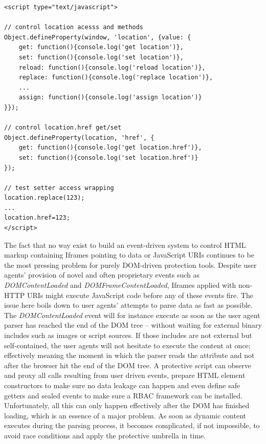 \begin{lstlisting}[captionpos=b,label=lst:location-control-ff,caption=Example code for location control in Firefox]
<script type="text/javascript">

// control location acesss and methods
Object.defineProperty(window, 'location', {value: {
    get: function(){console.log('get location')},
    set: function(){console.log('set location')},
    reload: function(){console.log('reload location')},
    replace: function(){console.log('replace location')},
    ...
    assign: function(){console.log('assign location')}
}});

// control location.href get/set
Object.defineProperty(location, 'href', {
    get: function(){console.log('get location.href')},
    set: function(){console.log('set location.href')}
});

// test setter access wrapping
location.replace(123);
...
location.href=123;
</script>
\end{lstlisting}

    The fact that no way exist to build an event-driven system to control HTML markup containing Iframes pointing to data or JavaScript URIs continues to be the most pressing problem for purely DOM-driven protection tools. Despite user agents' provision of novel and often proprietary events such as \textit{DOMContentLoaded} and \textit{DOMFrameContentLoaded}, Iframes applied with non-HTTP URIs might execute JavaScript code before any of these events fire. The issue here boils down to user agents' attempts to parse data as fast as possible. The \textit{DOMContentLoaded} event will for instance execute as soon as the user agent parser has reached the end of the DOM tree -- without waiting for external binary includes such as images or script sources. If those includes are not external but self-contained, the user agents will not hesitate to execute the content at once; effectively meaning the moment in which the parser reads the attribute and not after the browser hit the end of the DOM tree. A protective script can observe and proxy all calls resulting from user driven events, prepare HTML element constructors to make sure no data leakage can happen and even define safe getters and sealed events to make sure a RBAC framework can be installed. Unfortunately, all this can only happen effectively after the DOM has finished loading, which is an essence of a major problem. As soon as dynamic content executes during the parsing process, it becomes complicated, if not impossible, to avoid race conditions and apply the protective umbrella in time. \\

